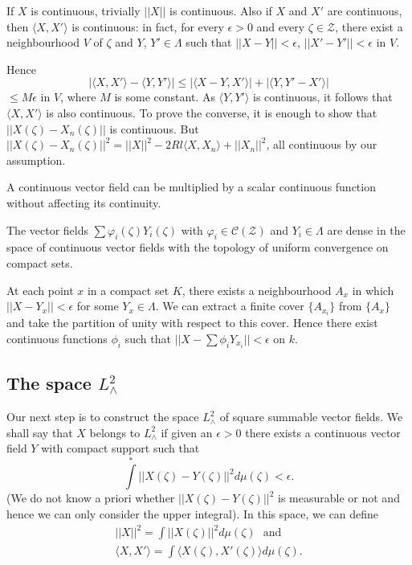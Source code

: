 If $X$ is continuous, trivially $|| X ||$ is continuous. Also if $X$
and $X'$ are continuous, then $\langle X,X'\rangle$ is continuous: in
fact, for every $\epsilon > 0$ and every $\zeta \in \mathcal{Z}$, there
exist a neighbourhood $V$ of $\zeta$ and $Y$, $Y' \in \Lambda$ such that
$|| X - Y|| < \epsilon$, $|| X' - Y' || < \epsilon$ in $V$. 


Hence  
$$
| \langle X,X' \rangle -  \langle Y,Y'\rangle |  \leq  |
\langle X - Y, X' \rangle | + | \langle Y,Y' - X'\rangle | 
$$ 
$\leq M \epsilon$ in $V$, where $M$ is some constant. As $\langle Y,Y'
\rangle$ is continuous, it follows that $\langle X,X'\rangle$ is also
continuous. To prove the converse, it is enough to show that $||
X(\zeta) - X_n (\zeta) ||$ is continuous. But $|| X(\zeta) -
X_n(\zeta) ||^{2}  = || X ||^{2} - 2Rl \langle X,X_n\rangle + || X_n
||^2 $, all continuous by our assumption. 

A continuous vector field can be multiplied by a scalar continuous
function without affecting its continuity. 

\begin{proposition}\label{partIII-chap1-prop2}%
The vector fields $\sum \varphi_i(\zeta)Y_i(\zeta)$ with $\varphi_i \in
\mathscr{C}(\mathcal{Z})$ and $Y_i \in \Lambda$ are dense in the space
of continuous vector fields with the topology of uniform convergence
on compact sets. 
\end{proposition}

At each point $x$ in a compact set $K$, there exists a neighbourhood
$A_x$ in which $|| X - Y_x || < \epsilon $ for some $Y_x \in \Lambda$. We
can extract a finite cover $\{A_{x_i}\}$ from $\{A_x\}$ and take
the partition of unity with respect to\pageoriginale 
this cover. Hence there exist
continuous functions $\phi_i$ such that $|| X-\sum \phi_i Y_{x_i}||<
\epsilon$ on $k$. 

\subsection{The space $ L^2_\wedge$}\label{partIII-chap1-sec1.3} %

Our next step is to construct the space $L^2_\wedge$ of square
summable  vector fields. We shall say that $X$  belongs to
$L^2_\wedge$ if given an $\epsilon >  0$ there exists a continuous vector
field $Y$ 
 with compact support such that 
$$
\int\limits^{*} || X (\zeta)-Y(\zeta)||^2 d\mu(\zeta)<\epsilon. 
$$
(We do not know  a priori whether $|| X(\zeta)-Y(\zeta)||^2$ is 
 measurable or not and hence we can only consider the upper
 integral). In this space, we can define 
\begin{gather*}
|| X ||^2 =\int || X(\zeta)||^2 d\mu(\zeta) \text{~ and}\\
\langle X,X' \rangle = \int  \langle X(\zeta), X' (\zeta) \rangle
d\mu(\zeta). 
\end{gather*}

